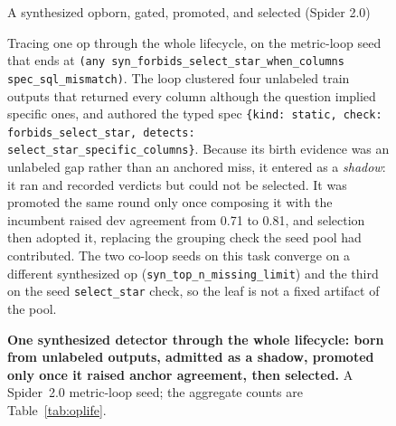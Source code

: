 \documentclass[letterpaper]{article} %
\newcommand{\cardsub}[1]{\hfill{\normalfont\footnotesize\color{inkmut}#1}}
\begin{document}
\begin{figure}[t]
\begin{taskbox}{A synthesized op\cardsub{born{,} gated{,} promoted{,} and selected (Spider 2.0)}}
\small\raggedright
Tracing one op through the whole lifecycle, on the metric-loop seed that ends at \texttt{(any syn\_forbids\_select\_star\_when\_columns spec\_sql\_mismatch)}. The loop clustered four unlabeled train outputs that returned every column although the question implied specific ones, and authored the typed spec \texttt{\{kind: static, check: forbids\_select\_star, detects: select\_star\_specific\_columns\}}. Because its birth evidence was an unlabeled gap rather than an anchored miss, it entered as a \emph{shadow}: it ran and recorded verdicts but could not be selected. It was promoted the same round only once composing it with the incumbent raised dev agreement from 0.71 to 0.81, and selection then adopted it, replacing the grouping check the seed pool had contributed. The two co-loop seeds on this task converge on a different synthesized op (\texttt{syn\_top\_n\_missing\_limit}) and the third on the seed \texttt{select\_star} check, so the leaf is not a fixed artifact of the pool.
\end{taskbox}
\caption{\textbf{One synthesized detector through the whole lifecycle: born from unlabeled outputs, admitted as a shadow, promoted only once it raised anchor agreement, then selected.} A Spider~2.0 metric-loop seed; the aggregate counts are Table~\ref{tab:oplife}.}
\label{fig:oplife}
\end{figure}
\end{document}
